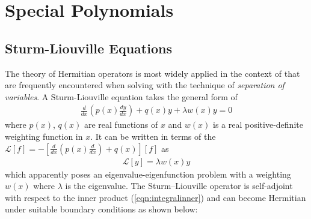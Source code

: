 \section{Special Polynomials}

\subsection{Sturm-Liouville Equations}

The theory of Hermitian operators is most widely applied in the context of  that are frequently encountered when solving  with the technique of \textit{separation of variables}. A Sturm-Liouville equation takes the general form of
\begin{align}
\frac{d}{dx} (p(x) \frac{dy}{dx}) + q(x) y + \lambda w(x)y = 0
\end{align}
where $p(x)$, $q(x)$ are real functions of $x$ and $w(x)$ is a real positive-definite weighting function in $x$. It can be written in terms of the  $\mathcal{L}[f] = -[\frac{d}{dx} (p(x) \frac{d}{dx}) + q(x)][f]$ as
\begin{align*}
\mathcal{L}[y] = \lambda w(x)y
\end{align*}
which apparently poses an eigenvalue-eigenfunction problem with a weighting $w(x)$ where $\lambda$ is the eigenvalue. The Sturm–Liouville operator is self-adjoint with respect to the inner product (\ref{eqn:integralinner}) and can become Hermitian under suitable boundary conditions as shown below:
